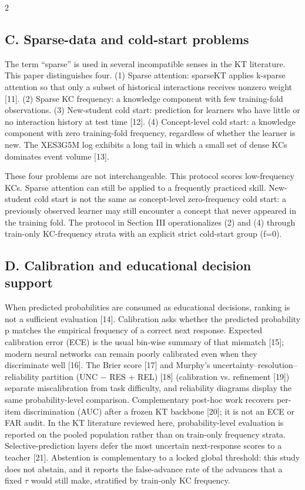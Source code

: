 \documentclass[10pt,a4paper]{article}
\begin{document}
\begin{multicols}{2}
\subsection*{C. Sparse-data and cold-start problems}

The term ``sparse'' is used in several incompatible senses in the KT literature. This paper distinguishes four. (1) Sparse attention: sparseKT applies k-sparse attention so that only a subset of historical interactions receives nonzero weight [11]. (2) Sparse KC frequency: a knowledge component with few training-fold observations. (3) New-student cold start: prediction for learners who have little or no interaction history at test time [12]. (4) Concept-level cold start: a knowledge component with zero training-fold frequency, regardless of whether the learner is new. The XES3G5M log exhibits a long tail in which a small set of dense KCs dominates event volume [13].

These four problems are not interchangeable. This protocol scores low-frequency KCs. Sparse attention can still be applied to a frequently practiced skill. New-student cold start is not the same as concept-level zero-frequency cold start: a previously observed learner may still encounter a concept that never appeared in the training fold. The protocol in Section III operationalizes (2) and (4) through train-only KC-frequency strata with an explicit strict cold-start group (f=0).

\subsection*{D. Calibration and educational decision support}

When predicted probabilities are consumed as educational decisions, ranking is not a sufficient evaluation [14]. Calibration asks whether the predicted probability p matches the empirical frequency of a correct next response. Expected calibration error (ECE) is the usual bin-wise summary of that mismatch [15]; modern neural networks can remain poorly calibrated even when they discriminate well [16]. The Brier score [17] and Murphy's uncertainty--resolution--reliability partition (UNC $-$ RES + REL) [18] (calibration vs. refinement [19]) separate miscalibration from task difficulty, and reliability diagrams display the same probability-level comparison. Complementary post-hoc work recovers per-item discrimination (AUC) after a frozen KT backbone [20]; it is not an ECE or FAR audit. In the KT literature reviewed here, probability-level evaluation is reported on the pooled population rather than on train-only frequency strata. Selective-prediction layers defer the most uncertain next-response scores to a teacher [21]. Abstention is complementary to a locked global threshold: this study does not abstain, and it reports the false-advance rate of the advances that a fixed $\tau$ would still make, stratified by train-only KC frequency.


\end{multicols}
\end{document}
